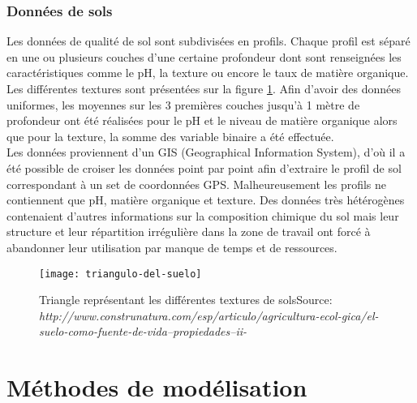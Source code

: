 \subsection{Données de sols} 
Les données de qualité de sol sont subdivisées en profils. Chaque profil est séparé en une ou plusieurs couches d’une certaine profondeur dont sont renseignées les caractéristiques comme le pH, la texture ou encore le taux de matière organique. Les différentes textures sont présentées sur la figure \ref{TriangleTexture}. Afin d'avoir des données uniformes, les moyennes sur les 3 premières couches jusqu'à 1 mètre de profondeur ont été réalisées pour le pH et le niveau de matière organique alors que pour la texture, la somme des variable binaire a été effectuée. \\


\noindent Les données proviennent d'un GIS (Geographical Information System), d'où il a été possible de croiser les données point par point afin d'extraire le profil de sol correspondant à un set de coordonnées GPS. Malheureusement les profils ne contiennent que pH, matière organique et texture. Des données très hétérogènes contenaient d'autres informations sur la composition chimique du sol mais leur structure et leur répartition irrégulière dans la zone de travail ont forcé à abandonner leur utilisation par manque de temps et de ressources.

\begin{figure}[H]
	\texttt{[image: triangulo-del-suelo]}
	\caption{\label{TriangleTexture} Triangle représentant les différentes textures de sols\newline Source: \textit{http://www.construnatura.com/esp/articulo/agricultura-ecol-gica/el-suelo-como-fuente-de-vida--propiedades--ii-}}
\end{figure}







\chapter{Méthodes de modélisation}
